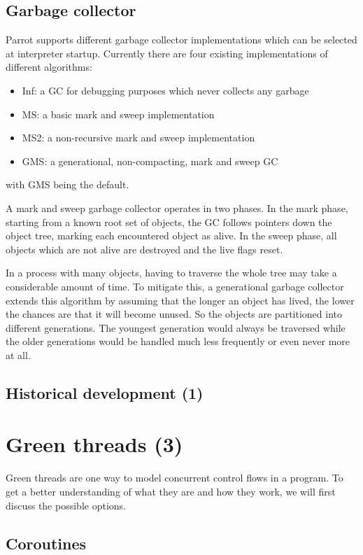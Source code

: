\documentclass[bachelor,english]{hgbthesis}
\begin{document}
\section{Garbage collector}

Parrot supports different garbage collector implementations which can be selected at interpreter startup. Currently there are four existing implementations of different algorithms:
\begin{itemize}
\item Inf: a GC for debugging purposes which never collects any garbage
\item MS: a basic mark and sweep implementation
\item MS2: a non-recursive mark and sweep implementation
\item GMS: a generational, non-compacting, mark and sweep GC
\end{itemize}
with GMS being the default.

A mark and sweep garbage collector operates in two phases. In the mark phase, starting from a known root set of objects, the GC follows pointers down the object tree, marking each encountered object as alive. In the sweep phase, all objects which are not alive are destroyed and the live flags reset.

In a process with many objects, having to traverse the whole tree may take a considerable amount of time. To mitigate this, a generational garbage collector extends this algorithm by assuming that the longer an object has lived, the lower the chances are that it will become unused. So the objects are partitioned into different generations. The youngest generation would always be traversed while the older generations would be handled much less frequently or even never more at all.

\section{Historical development (1)}

\chapter{Green threads (3)}

Green threads are one way to model concurrent control flows in a program. To get a better understanding of what they are and how they work, we will first discuss the possible options.

\section{Coroutines}
\end{document}
